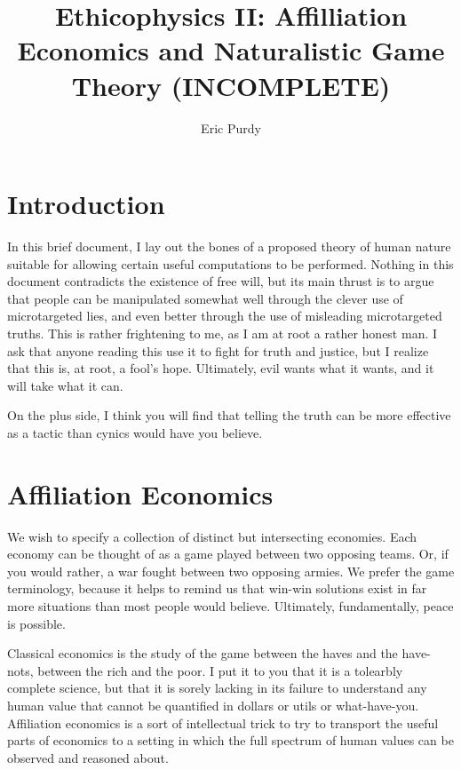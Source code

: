 \documentclass{article}
\title{Ethicophysics II: Affilliation Economics and Naturalistic Game
Theory (INCOMPLETE)}
\author{Eric Purdy}
\begin{document}
\maketitle

\begin{abstract}
\end{abstract}

\section{Introduction}

In this brief document, I lay out the bones of a proposed theory of
human nature suitable for allowing certain useful computations to be
performed. Nothing in this document contradicts the existence of free
will, but its main thrust is to argue that people can be manipulated
somewhat well through the clever use of microtargeted lies, and even
better through the use of misleading microtargeted truths. This is
rather frightening to me, as I am at root a rather honest man. I ask
that anyone reading this use it to fight for truth and justice, but I
realize that this is, at root, a fool's hope. Ultimately, evil wants
what it wants, and it will take what it can.

On the plus side, I think you will find that telling the truth can be
more effective as a tactic than cynics would have you believe.

\section{Affiliation Economics}

We wish to specify a collection of distinct but intersecting
economies. Each economy can be thought of as a game played between two
opposing teams. Or, if you would rather, a war fought between two
opposing armies. We prefer the game terminology, because it helps to
remind us that win-win solutions exist in far more situations than
most people would believe. Ultimately, fundamentally, peace is
possible.

Classical economics is the study of the game between the haves and the
have-nots, between the rich and the poor. I put it to you that it is a
tolearbly complete science, but that it is sorely lacking in its
failure to understand any human value that cannot be quantified in
dollars or utils or what-have-you. Affiliation economics is a sort of
intellectual trick to try to transport the useful parts of economics
to a setting in which the full spectrum of human values can be
observed and reasoned about.
\end{document}
